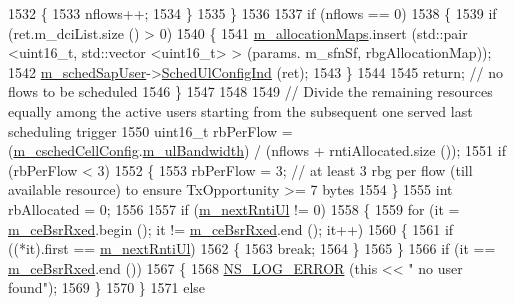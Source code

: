 \begin{DoxyCode}
1532         \{
1533           nflows++;
1534         \}
1535     \}
1536 
1537   \textcolor{keywordflow}{if} (nflows == 0)
1538     \{
1539       \textcolor{keywordflow}{if} (ret.m\_dciList.size () > 0)
1540         \{
1541           \hyperlink{classns3_1_1TtaFfMacScheduler_a8931533e6964833d4e1da1e8c6d20313}{m\_allocationMaps}.insert (std::pair <uint16\_t, std::vector <uint16\_t> > (params.
      m\_sfnSf, rbgAllocationMap));
1542           \hyperlink{classns3_1_1TtaFfMacScheduler_a950cb3e5f468debf1fa002171ff299f1}{m\_schedSapUser}->\hyperlink{classns3_1_1FfMacSchedSapUser_a1b89636256701a84d990db7db8aea874}{SchedUlConfigInd} (ret);
1543         \}
1544         
1545       \textcolor{keywordflow}{return};  \textcolor{comment}{// no flows to be scheduled}
1546     \}
1547 
1548 
1549   \textcolor{comment}{// Divide the remaining resources equally among the active users starting from the subsequent one served
       last scheduling trigger}
1550   uint16\_t rbPerFlow = (\hyperlink{classns3_1_1TtaFfMacScheduler_af263a06ea69ff1d096ddb48df0ac7f81}{m\_cschedCellConfig}.\hyperlink{structns3_1_1FfMacCschedSapProvider_1_1CschedCellConfigReqParameters_a5ab5b102878e6e7e7727a14af4a64d2f}{m\_ulBandwidth}) / (nflows + 
      rntiAllocated.size ());
1551   \textcolor{keywordflow}{if} (rbPerFlow < 3)
1552     \{
1553       rbPerFlow = 3;  \textcolor{comment}{// at least 3 rbg per flow (till available resource) to ensure TxOpportunity >= 7
       bytes}
1554     \}
1555   \textcolor{keywordtype}{int} rbAllocated = 0;
1556 
1557   \textcolor{keywordflow}{if} (\hyperlink{classns3_1_1TtaFfMacScheduler_a4342a2e63a980d852d3cb6ef1e77197b}{m\_nextRntiUl} != 0)
1558     \{
1559       \textcolor{keywordflow}{for} (it = \hyperlink{classns3_1_1TtaFfMacScheduler_a6b88fda6059c5679b747c2e1856729b1}{m\_ceBsrRxed}.begin (); it != \hyperlink{classns3_1_1TtaFfMacScheduler_a6b88fda6059c5679b747c2e1856729b1}{m\_ceBsrRxed}.end (); it++)
1560         \{
1561           \textcolor{keywordflow}{if} ((*it).first == \hyperlink{classns3_1_1TtaFfMacScheduler_a4342a2e63a980d852d3cb6ef1e77197b}{m\_nextRntiUl})
1562             \{
1563               \textcolor{keywordflow}{break};
1564             \}
1565         \}
1566       \textcolor{keywordflow}{if} (it == \hyperlink{classns3_1_1TtaFfMacScheduler_a6b88fda6059c5679b747c2e1856729b1}{m\_ceBsrRxed}.end ())
1567         \{
1568           \hyperlink{group__logging_ga0261a8db1d4ac5f79417d117634fd455}{NS\_LOG\_ERROR} (\textcolor{keyword}{this} << \textcolor{stringliteral}{" no user found"});
1569         \}
1570     \}
1571   \textcolor{keywordflow}{else}

\end{DoxyCode}
